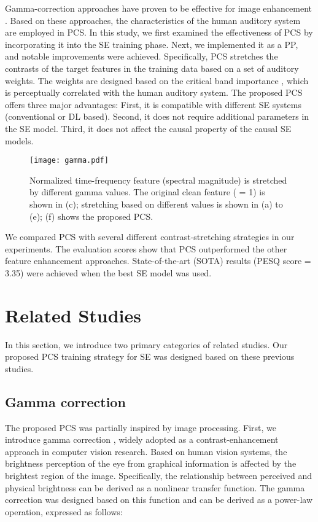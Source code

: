 \documentclass[a4paper]{article}
\begin{document}
Gamma-correction approaches have proven to be effective for image enhancement \cite{rahman2016adaptive}. Based on these approaches, the characteristics of the human auditory system are employed in PCS. In this study, we first examined the effectiveness of PCS by incorporating it into the SE training phase. Next, we implemented it as a PP, and notable improvements were achieved. Specifically, PCS stretches the contrasts of the target features in the training data based on a set of auditory weights. The weights are designed based on the critical band importance \cite{pavlovic2018sii}, which is perceptually correlated with the human auditory system. The proposed PCS offers three major advantages: First, it is compatible with different SE systems (conventional or DL based). Second, it does not require additional parameters in the SE model. Third, it does not affect the causal property of the causal SE models.
\begin{figure*}
 \centering
 \texttt{[image: gamma.pdf]}
 \caption{Normalized time-frequency feature (spectral magnitude) is stretched by different gamma values. The original clean feature ( = 1) is shown in (c); stretching based on different  values is shown in (a) to (e); (f) shows the proposed PCS.} 
 \label{fig:gammagraph}
\end{figure*}
We compared PCS with several different contrast-stretching strategies in our experiments. The evaluation scores show that PCS outperformed the other feature enhancement approaches. State-of-the-art (SOTA) results (PESQ score = 3.35) were achieved when the best SE model was used.




\section{Related Studies}
In this section, we introduce two primary categories of related studies. Our proposed PCS training strategy for SE was designed based on these previous studies. 

\subsection{Gamma correction}
\label{ssec:gammacorrection}

The proposed PCS was partially inspired by image processing. First, we introduce gamma correction \cite{poynton2012digital}, widely adopted as a contrast-enhancement approach in computer vision research. Based on human vision systems, the brightness perception of the eye from graphical information is affected by the brightest region of the image. Specifically, the relationship between perceived and physical brightness can be derived as a nonlinear transfer function. The gamma correction was designed based on this function and can be derived as a power-law operation, expressed as follows:
\end{document}
